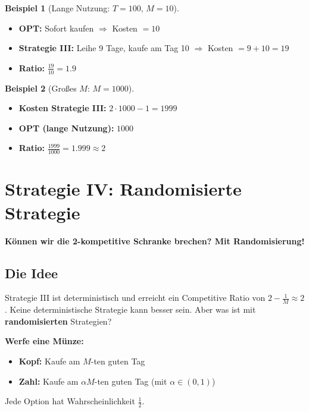 \documentclass[12pt,a4paper]{article}
\theoremstyle{definition}
\newtheorem{beispiel}{Beispiel}
\begin{document}
\begin{beispiel}[Lange Nutzung: $T = 100$, $M = 10$]
\begin{itemize}
    \item \textbf{OPT:} Sofort kaufen $\Rightarrow$ Kosten $= 10$
    \item \textbf{Strategie III:} Leihe 9 Tage, kaufe am Tag 10 $\Rightarrow$ Kosten $= 9 + 10 = 19$
    \item \textbf{Ratio:} $\displaystyle\frac{19}{10} = 1.9$
\end{itemize}
\end{beispiel}

\begin{beispiel}[Großes $M$: $M = 1000$]
\begin{itemize}
    \item \textbf{Kosten Strategie III:} $2 \cdot 1000 - 1 = 1999$
    \item \textbf{OPT (lange Nutzung):} $1000$
    \item \textbf{Ratio:} $\displaystyle\frac{1999}{1000} = 1.999 \approx 2$
\end{itemize}
\end{beispiel}

\section{Strategie IV: Randomisierte Strategie}

\begin{center}
\colorbox{orange!50}{\large \textbf{Können wir die 2-kompetitive Schranke brechen? Mit Randomisierung!}}
\end{center}

\subsection{Die Idee}

Strategie III ist deterministisch und erreicht ein Competitive Ratio von $2 - \frac{1}{M} \approx 2$. Keine deterministische Strategie kann besser sein. Aber was ist mit \textbf{randomisierten} Strategien?

\begin{tcolorbox}[colback=orange!5!white,colframe=orange!75!black,title=Strategie IV]
\textbf{Werfe eine Münze:}
\begin{itemize}
    \item \textbf{Kopf:} Kaufe am $M$-ten guten Tag
    \item \textbf{Zahl:} Kaufe am $\alpha M$-ten guten Tag (mit $\alpha \in (0,1)$)
\end{itemize}

Jede Option hat Wahrscheinlichkeit $\frac{1}{2}$.
\end{tcolorbox}
\end{document}
